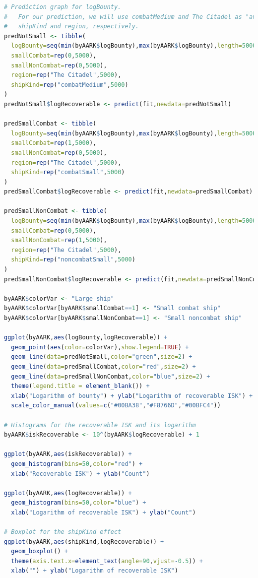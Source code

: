 \documentclass[letterpaper,12pt,article]{memoir}
\begin{document}
{\begin{lstlisting}[language=R]
# Prediction graph for logBounty.
#   For our prediction, we will use combatMedium and The Citadel as "average"
#   shipKind and region, respectively.
predNotSmall <- tibble(
  logBounty=seq(min(byAARK$logBounty),max(byAARK$logBounty),length=5000),
  smallCombat=rep(0,5000),
  smallNonCombat=rep(0,5000),
  region=rep("The Citadel",5000),
  shipKind=rep("combatMedium",5000)
)
predNotSmall$logRecoverable <- predict(fit,newdata=predNotSmall)

predSmallCombat <- tibble(
  logBounty=seq(min(byAARK$logBounty),max(byAARK$logBounty),length=5000),
  smallCombat=rep(1,5000),
  smallNonCombat=rep(0,5000),
  region=rep("The Citadel",5000),
  shipKind=rep("combatSmall",5000)
)
predSmallCombat$logRecoverable <- predict(fit,newdata=predSmallCombat)

predSmallNonCombat <- tibble(
  logBounty=seq(min(byAARK$logBounty),max(byAARK$logBounty),length=5000),
  smallCombat=rep(0,5000),
  smallNonCombat=rep(1,5000),
  region=rep("The Citadel",5000),
  shipKind=rep("noncombatSmall",5000)
)
predSmallNonCombat$logRecoverable <- predict(fit,newdata=predSmallNonCombat)

byAARK$colorVar <- "Large ship"
byAARK$colorVar[byAARK$smallCombat==1] <- "Small combat ship"
byAARK$colorVar[byAARK$smallNonCombat==1] <- "Small noncombat ship"

ggplot(byAARK,aes(logBounty,logRecoverable)) + 
  geom_point(aes(color=colorVar),show.legend=TRUE) + 
  geom_line(data=predNotSmall,color="green",size=2) + 
  geom_line(data=predSmallCombat,color="red",size=2) + 
  geom_line(data=predSmallNonCombat,color="blue",size=2) + 
  theme(legend.title = element_blank()) +
  xlab("Logarithm of bounty") + ylab("Logarithm of recoverable ISK") + 
  scale_color_manual(values=c("#00BA38","#F8766D","#00BFC4"))

# Histograms for the recoverable ISK and its logarithm
byAARK$iskRecoverable <- 10^(byAARK$logRecoverable) + 1

ggplot(byAARK,aes(iskRecoverable)) + 
  geom_histogram(bins=50,color="red") + 
  xlab("Recoverable ISK") + ylab("Count")

ggplot(byAARK,aes(logRecoverable)) + 
  geom_histogram(bins=50,color="blue") + 
  xlab("Logarithm of recoverable ISK") + ylab("Count")

# Boxplot for the shipKind effect
ggplot(byAARK,aes(shipKind,logRecoverable)) + 
  geom_boxplot() + 
  theme(axis.text.x=element_text(angle=90,vjust=-0.5)) +
  xlab("") + ylab("Logarithm of recoverable ISK")

\end{lstlisting}
}

\newpage
\thispagestyle{empty}
\mbox{}
\newpage
\end{document}
